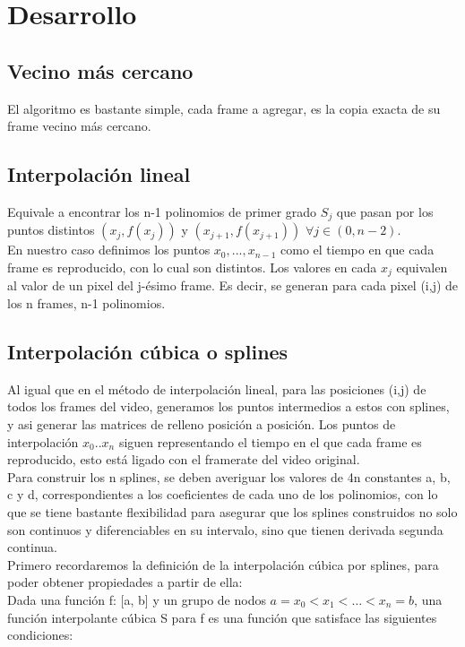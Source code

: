 \section{Desarrollo}

\subsection{Vecino más cercano}
El algoritmo es bastante simple, cada frame a agregar, es la copia exacta de su frame vecino más cercano.\\

\subsection{Interpolación lineal}
Equivale a encontrar los n-1 polinomios de primer grado $S_{j}$ que pasan por los puntos distintos $(x_{j},f(x_{j}))$ y $(x_{j+1},f(x_{j+1}))$ $\forall j \in (0,n-2)$.\\
En nuestro caso definimos los puntos $x_{0}, ... , x_{n-1}$ como el tiempo en que cada frame es reproducido, con lo cual son distintos. Los valores en cada $x_{j}$ equivalen al valor de un pixel del j-ésimo frame. Es decir, se generan para cada pixel (i,j) de los n frames, n-1 polinomios.\\


\subsection{Interpolación cúbica o splines}

Al igual que en el método de interpolación lineal, para las posiciones (i,j) de todos los frames del video, generamos los puntos intermedios a estos con splines, y asi generar las matrices de relleno posición a posición. Los puntos de interpolación $x_{0} .. x_{n}$ siguen representando el tiempo en el que cada frame es reproducido, esto está ligado con el framerate del video original.\\

Para construir los n splines, se deben averiguar los valores de 4n constantes a, b, c y d, correspondientes a los coeficientes de cada uno de los polinomios, con lo que se tiene bastante flexibilidad para asegurar que los splines construidos no solo son continuos y diferenciables en su intervalo, sino que tienen derivada segunda continua.\\
Primero recordaremos la definición de la interpolación cúbica por splines, para poder obtener propiedades a partir de ella: \\
Dada una función f: [a, b] y un grupo de nodos $a= x_{0} < x_{1} < … < x_{n} = b$, una función interpolante cúbica S para f es una función que satisface las siguientes condiciones: \\

